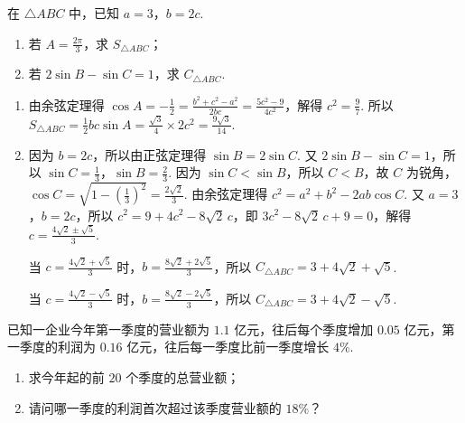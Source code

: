 \begin{problem}
在 \(\triangle ABC\) 中，已知 \(a=3\)，\(b=2c\).

\begin{enumerate}
\item 若 \(A=\frac{2\pi}{3}\)，求 \(S_{\triangle ABC}\)；
\item 若 \(2\sin B-\sin C=1\)，求 \(C_{\triangle ABC}\).
\end{enumerate}
\end{problem}

\begin{solution}
\begin{enumerate}
\item 由余弦定理得 \(\cos A=-\frac12=\frac{b^2+c^2-a^2}{2bc}=\frac{5c^2-9}{4c^2}\)，解得 \(c^2=\frac97\). 所以 \(S_{\triangle ABC}=\frac12bc\sin A=\frac{\sqrt3}{4}\times 2c^2=\frac{9\sqrt3}{14}\).

\item 因为 \(b=2c\)，所以由正弦定理得 \(\sin B=2\sin C\). 又 \(2\sin B-\sin C=1\)，所以 \(\sin C=\frac13\)，\(\sin B=\frac23\). 因为 \(\sin C<\sin B\)，所以 \(C<B\)，故 \(C\) 为锐角，\(\cos C=\sqrt{1-\left( \frac13 \right)^2}=\frac{2\sqrt2}{3}\). 由余弦定理得 \(c^2=a^2+b^2-2ab\cos C\). 又 \(a=3\)，\(b=2c\)，所以 \(c^2=9+4c^2-8\sqrt2\,c\)，即 \(3c^2-8\sqrt2\,c+9=0\)，解得 \(c=\frac{4\sqrt2\pm \sqrt5}{3}\).

当 \(c=\frac{4\sqrt2+\sqrt5}{3}\) 时，\(b=\frac{8\sqrt2+2\sqrt5}{3}\)，所以 \(C_{\triangle ABC}=3+4\sqrt2+\sqrt5\).

当 \(c=\frac{4\sqrt2-\sqrt5}{3}\) 时，\(b=\frac{8\sqrt2-2\sqrt5}{3}\)，所以 \(C_{\triangle ABC}=3+4\sqrt2-\sqrt5\).
\end{enumerate}
\end{solution}

\begin{problem}
已知一企业今年第一季度的营业额为 \(1.1\) 亿元，往后每个季度增加 \(0.05\) 亿元，第一季度的利润为 \(0.16\) 亿元，往后每一季度比前一季度增长 \(4\%\).

\begin{enumerate}
\item 求今年起的前 \(20\) 个季度的总营业额；
\item 请问哪一季度的利润首次超过该季度营业额的 \(18\%\)？
\end{enumerate}
\end{problem}

